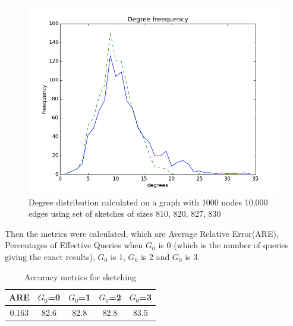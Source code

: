 \documentclass[conference]{IEEEtran}
\begin{document}
\begin{figure}[!t]
\centering
\includegraphics[width=0.7\linewidth]{n1000-e10000-sketches-810-820-823-827-830plot}
\caption[1000 nodes 10,000 edges with sketches of sizes 810, 820, 827, 830]{Degree distribution calculated on a graph with 1000 nodes 10,000 edges using set of sketches of sizes 810, 820, 827, 830}
\label{fig:1000 nodes 10,000 edges with sketches of sizes 810, 820, 827, 830}
\end{figure}

Then the metrics were calculated, which are Average Relative Error(ARE), Percentages of Effective Queries when $G_0$ is 0 (which is the number of queries giving the exact results), $G_0$ is 1, $G_0$ is 2 and $G_0$ is 3.


\begin{table}[!b]
\caption{Accuracy metrics for sketching}
\label{table:accuracy-metrics-for-sketching}
\renewcommand{\arraystretch}{1.5}
\centering
\begin{tabular}{|c|c|c|c|c|}
\hline
 ARE   & $G_0$=0 & $G_0$=1 & $G_0$=2 & $G_0$=3 \\ \hline
0.163 &   82.6  &   82.8  &   82.8  &   83.5  \\ \hline
\end{tabular}
\end{table}
\end{document}
